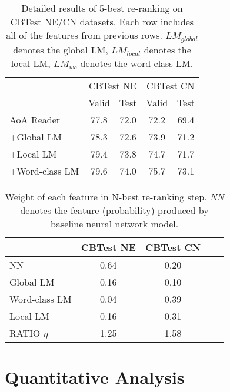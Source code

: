 \documentclass[11pt,a4paper]{article}
\begin{document}
        \begin{table}[tp]
        \begin{center}
        \begin{tabular}{lcccc}
        \toprule
        & \multicolumn{2}{p{1.8cm}}{\centering CBTest NE} & \multicolumn{2}{p{1.8cm}}{\centering CBTest CN}\\
        & Valid & Test & Valid & Test\\
        \midrule
        AoA Reader & 77.8 & 72.0 & 72.2 & 69.4 \\
        +Global LM& 78.3 & 72.6 & 73.9 & 71.2 \\
        +Local LM& 79.4 & 73.8 & 74.7 & 71.7 \\
        +Word-class LM& 79.6 & 74.0 & 75.7 & 73.1 \\
        \bottomrule
        \end{tabular}
        \end{center}
        \caption{\label{rerank-cbt} Detailed results of 5-best re-ranking on CBTest NE/CN datasets. Each row includes all of the features from previous rows. $LM_{global}$ denotes the global LM, $LM_{local}$ denotes the local LM, $LM_{wc}$ denotes the word-class LM.
         }
        \end{table}
        
        \begin{table}[tp]
        \begin{center}
        \begin{tabular}{lcccc}
        \toprule
        & {\centering CBTest NE} & {\centering CBTest CN} \\
        \midrule
        NN & 0.64 & 0.20 \\
        Global LM & 0.16 & 0.10 \\
        Word-class LM & 0.04 & 0.39 \\
        Local LM & 0.16 & 0.31 \\
        \hline
        RATIO $\eta$ & 1.25 & 1.58 \\
        \bottomrule
        \end{tabular}
        \end{center}
        \caption{\label{weights-cbt} Weight of each feature in N-best re-ranking step. {\em NN} denotes the feature (probability) produced by baseline neural network model.
         }
        \end{table}
        

\section{Quantitative Analysis}\label{analysis}
\end{document}

